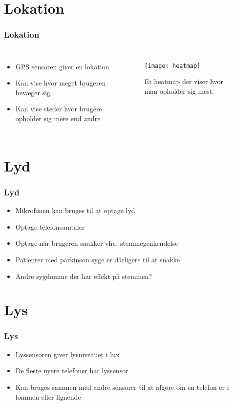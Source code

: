 \section{Lokation}
\begin{frame}[fragile]
\frametitle{Lokation}
\begin{columns}
\column[t]{5cm}
\begin{itemize}
\item GPS sensoren giver en lokation
\item Kan vise hvor meget brugeren bevæger sig
\item Kan vise steder hvor brugere opholder sig mere end andre
\end{itemize}
\column[t]{5cm}
\begin{figure}
\texttt{[image: heatmap]}
\caption{Et heatmap der viser hvor man opholder sig mest.}
\end{figure}
\end{columns}
\end{frame}



\section{Lyd}
\begin{frame}
\frametitle{Lyd}
\begin{itemize}
\item Mikrofonen kan bruges til at optage lyd
\item Optage telefonsamtaler
\item Optage når brugeren snakker vha. stemmegenkendelse
\item Patienter med parkinson syge er dårligere til at snakke
\item Andre sygdomme der har effekt på stemmen?
\end{itemize}
\end{frame}



\section{Lys}
\begin{frame}
\frametitle{Lys}
\begin{itemize}
\item Lyssensoren giver lysniveauet i lux
\item De fleste nyere telefoner har lyssensor
\item Kan bruges sammen med andre sensorer til at afgøre om en telefon er i lommen eller lignende
\end{itemize}
\end{frame}



